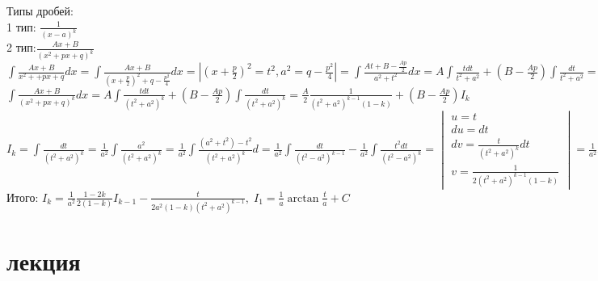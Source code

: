 \documentclass[14pt]{article}
\begin{document}
	Типы дробей: \\
	1 тип: $\frac{1}{(x-a)^k}$ \\
	2 тип:$\frac{Ax+B}{(x^2+px+q)^k}$\\
	$\int \frac{Ax+B}{x^2++px+q}dx = \int \frac{Ax+B}{(x+\frac{p}{2})^2 + q - \frac{p^2}{4}}dx = | (x+\frac{p}{2})^2 = t^2, a^2=q-\frac{p^2}{4}| =\int \frac{At+B-\frac{Ap}{2}}{a^2+t^2}dx = A\int \frac{tdt}{t^2+a^2} + (B-\frac{Ap}{2})\int \frac{dt}{t^2+a^2} = \frac{A}{2}\ln(t^2 + a^2) + (B-\frac{Ap}{2}\cdot \frac{1}{a}\arctan \frac{t}{a})$ \\
	$\int \frac{Ax+B}{(x^2 +px + q)^k}dx = A\int \frac{tdt}{(t^2+a^2)^k} + (B-\frac{Ap}{2})\int\frac{dt}{(t^2+a^2)^k} = \frac{A}{2}\frac{1}{(t^2+a^2)^{k-1}(1-k)}+(B-\frac{Ap}{2})I_k$ \\
	$I_k = \int \frac{dt}{(t^2+a^2)^k}=\frac{1}{a^2}\int \frac{a^2}{(t^2+a^2)^k} = \frac{1}{a^2} \int \frac{(a^2 + t^2)-t^2}{(t^2+a^2)^k}d= \frac{1}{a^2} \int \frac{dt}{(t^2-a^2)^{k-1}} - \frac{1}{a^2}\int\frac{t^2dt}{(t^2-a^2)^k} = 
	\begin{vmatrix}
		 u=t \\
		 du=dt\\
		 dv=\frac{t}{(t^2+a^2)^k}dt \\
		 v = \frac{1}{2(t^2+a^2)^{k-1}(1-k)}
	\end{vmatrix} = \frac{1}{a^2}I_{k-1} - \frac{1}{a^2} (\frac{t}{2(1-k)(t^2+a^2)^{k-1}} - \frac{1}{2(1-k)}I_{k-1})$ \\
	Итого: $I_k = \frac{1}{a^2}\frac{1-2k}{2(1-k)}I_{k-1}-\frac{t}{2a^2(1-k)(t^2+a^2)^{k-1}}, \; I_1 = \frac{1}{a}\arctan\frac{t}{a}+C$
	\section{лекция}
\end{document}
